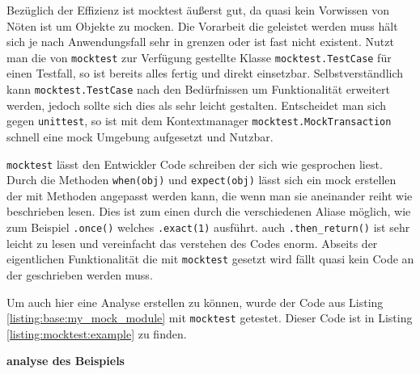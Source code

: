 Bezüglich der Effizienz ist mocktest äußerst gut, da quasi kein Vorwissen von Nöten ist um Objekte zu \gls{mock}en. Die
Vorarbeit die geleistet werden muss hält sich je nach Anwendungsfall sehr in grenzen oder ist fast nicht existent. Nutzt
man die von \lstinline{mocktest} zur Verfügung gestellte Klasse \lstinline{mocktest.TestCase} für einen Testfall, so ist
bereits alles fertig und direkt einsetzbar. Selbstverständlich kann \lstinline{mocktest.TestCase} nach den Bedürfnissen
um Funktionalität erweitert werden, jedoch sollte sich dies als sehr leicht gestalten. Entscheidet man sich gegen
\lstinline{unittest}, so ist mit dem Kontextmanager \lstinline{mocktest.MockTransaction} schnell eine \Gls{mock}
Umgebung aufgesetzt und Nutzbar.

\lstinline{mocktest} lässt den Entwickler Code schreiben der sich wie gesprochen liest. Durch die Methoden
\lstinline{when(obj)} und \lstinline{expect(obj)} lässt sich ein \Gls{mock} erstellen der mit Methoden angepasst werden
kann, die wenn man sie aneinander reiht wie beschrieben lesen. Dies ist zum einen durch die verschiedenen Aliase möglich,
wie zum Beispiel \lstinline{.once()} welches \lstinline{.exact(1)} ausführt. auch \lstinline{.then_return()} ist sehr
leicht zu lesen und vereinfacht das verstehen des Codes enorm. Abseits der eigentlichen Funktionalität die mit
\lstinline{mocktest} gesetzt wird fällt quasi kein Code an der geschrieben werden muss.

Um auch hier eine Analyse erstellen zu können, wurde der Code aus Listing \ref{listing:base:my_mock_module} mit
\lstinline{mocktest} getestet. Dieser Code ist in Listing \ref{listing:mocktest:example} zu finden.

\textbf{analyse des Beispiels}